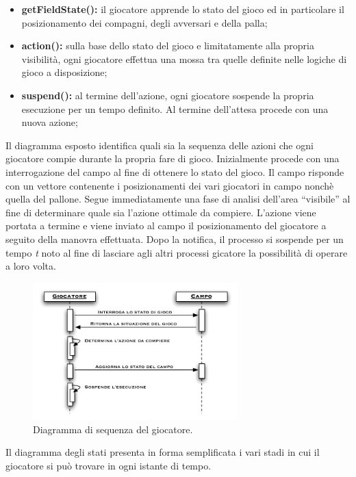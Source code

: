\documentclass[aps,letterpaper,10pt]{article}
\begin{document}
\begin{itemize}
	\item \textbf{getFieldState():} il giocatore apprende lo stato del gioco ed in particolare il posizionamento dei compagni, degli avversari e della palla;
	\item \textbf{action():} sulla base dello stato del gioco e limitatamente alla propria visibilit\`a, ogni giocatore effettua una mossa tra quelle definite nelle logiche di gioco a disposizione;
	\item \textbf{suspend():} al termine dell'azione, ogni giocatore sospende la propria esecuzione per un tempo definito. Al termine dell'attesa procede con una nuova azione;
\end{itemize}

Il diagramma esposto identifica quali sia la sequenza delle azioni che ogni giocatore compie durante la propria fare di gioco. Inizialmente procede con una interrogazione del campo al fine di ottenere lo stato del gioco. Il campo risponde con un vettore contenente i posizionamenti dei vari giocatori in campo nonch\`e quella del pallone. Segue immediatamente una fase di analisi dell'area ``visibile'' al fine di determinare quale sia l'azione ottimale da compiere. L'azione viene portata a termine e viene inviato al campo il posizionamento del giocatore a seguito della manovra effettuata. Dopo la notifica, il processo si sospende per un tempo \emph{t} noto al fine di lasciare agli altri processi gicatore la possibilit\`a di operare a loro volta.

\begin{figure}[H]
	\begin{center}
		\includegraphics[width=300px]{images/sequence-player.pdf}
	\end{center}
\caption{Diagramma di sequenza del giocatore.}
\end{figure}

Il diagramma degli stati presenta in forma semplificata i vari stadi in cui il giocatore si pu\`o trovare in ogni istante di tempo. \vspace{3mm}
\end{document}
